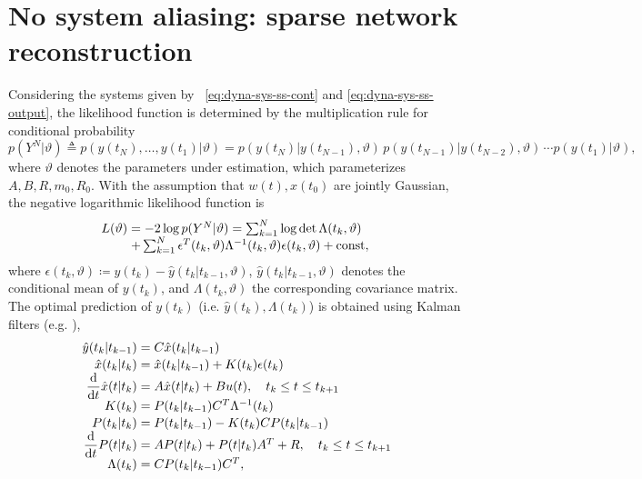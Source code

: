 \documentclass[letterpaper,10pt,journal,final]{IEEEtran}
\theoremstyle{definition}
\theoremstyle{remark}
\begin{document}
\section{No system aliasing: sparse network reconstruction}
\label{sec:methods}


Considering the systems given by ~\eqref{eq:dyna-sys-ss-cont} and
\eqref{eq:dyna-sys-ss-output},
the likelihood function is determined by the multiplication rule for conditional
probability\cite{Astrom1980}
\begin{math}
  p(Y^N | \vartheta) \triangleq p(y(t_N), \dots, y(t_1) | \vartheta) =
  p(y(t_N) | y(t_{N-1}),\vartheta)\,
  p(y(t_{N-1}) | y(t_{N-2}),\vartheta)\,
  \cdots p(y(t_1)| \vartheta),
\end{math}
where $\vartheta$ denotes the parameters under estimation, which parameterizes
$A, B, R, m_0, R_0$.
With the assumption that $w(t), x(t_0)$ are jointly Gaussian,
the negative logarithmic likelihood function is
\begin{equation}
  \label{eq:likelihood-func}
  \begin{array}{@{}l@{\;}l@{\;}l}
    L(\vartheta) &= -2\log p(Y^N|\vartheta)
                   = \sum_{k=1}^N \log \det \Lambda(t_k,\vartheta)\\
    &+ \sum_{k=1}^N \epsilon^T(t_k,\vartheta) \Lambda^{-1}(t_k,\vartheta)
                   \epsilon(t_k,\vartheta) + \mathrm{const},
\end{array}
\end{equation}
where $\epsilon(t_k,\vartheta) \coloneqq y(t_k) - \hat{y}(t_k | t_{k-1},\vartheta)$,
$\hat{y}(t_k | t_{k-1},\vartheta)$ denotes the conditional mean of $y(t_k)$, and
$\Lambda(t_k,\vartheta)$ the corresponding covariance matrix.  The optimal prediction of
$y(t_k)$ (i.e. $\hat{y}(t_k), \Lambda(t_k)$) is obtained using Kalman filters
(e.g. \cite{Astrom1980,Ljung2010}),
\begin{equation}
  \label{eq:pred-Kalman-filter}
  \begin{array}{r@{\;}l}
    \hat{y}(t_k|t_{k-1}) &= C \hat{x}(t_k|t_{k-1}) \\[.5mm]
    \hat{x}(t_k | t_k) &= \hat{x}(t_k|t_{k-1}) + K(t_k) \epsilon(t_k) \\
    \displaystyle\frac{\mathrm{d}}{\mathrm{d}t} \hat{x}(t|t_k) &= A \hat{x}(t|t_k) +
              B u(t), \quad t_k \leq t \leq t_{k+1}\\
K(t_k) &= P(t_k|t_{k-1}) C^T \Lambda^{-1}(t_k) \\[.5mm]
    P(t_k|t_k) &= P(t_k|t_{k-1}) - K(t_k) C P(t_k|t_{k-1})\\
    \displaystyle \frac{\mathrm{d}}{\mathrm{d}t}P(t|t_k) &= A P(t|t_k) + P(t|t_k)A^T
               + R, \quad t_k \leq t \leq t_{k+1}\\
\Lambda(t_k) &= CP(t_k|t_{k-1})C^T,
  \end{array}
\end{equation}
\end{document}

